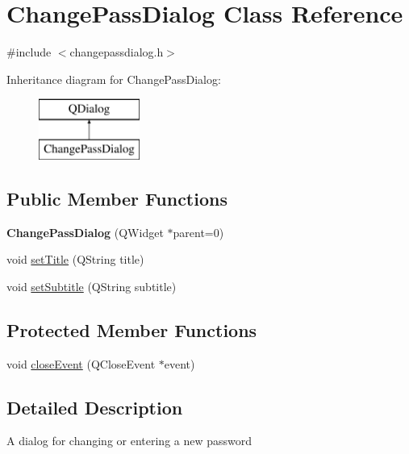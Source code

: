 \hypertarget{class_change_pass_dialog}{\section{Change\+Pass\+Dialog Class Reference}
\label{class_change_pass_dialog}
}


{\ttfamily \#include $<$changepassdialog.\+h$>$}

Inheritance diagram for Change\+Pass\+Dialog\+:\begin{figure}[H]
\begin{center}
\leavevmode
\includegraphics[height=2.000000cm]{class_change_pass_dialog}
\end{center}
\end{figure}
\subsection*{Public Member Functions}
\begin{DoxyCompactItemize}
\item 
\hypertarget{class_change_pass_dialog_ad6f0b8725148486bd3d3240366d01333}{{\bfseries Change\+Pass\+Dialog} (Q\+Widget $\ast$parent=0)}\label{class_change_pass_dialog_ad6f0b8725148486bd3d3240366d01333}

\item 
void \hyperlink{class_change_pass_dialog_a86889ca01de70686efcfe198d0e96963}{set\+Title} (Q\+String title)
\item 
void \hyperlink{class_change_pass_dialog_a6964624bf760e029877b9c7e25d50d18}{set\+Subtitle} (Q\+String subtitle)
\end{DoxyCompactItemize}
\subsection*{Protected Member Functions}
\begin{DoxyCompactItemize}
\item 
void \hyperlink{class_change_pass_dialog_ab086e0854e5e5f15b810ad09f9b18b91}{close\+Event} (Q\+Close\+Event $\ast$event)
\end{DoxyCompactItemize}


\subsection{Detailed Description}
A dialog for changing or entering a new password 

